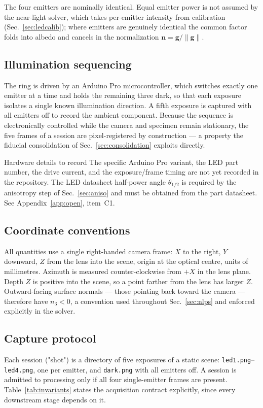\documentclass[journal,10pt]{IEEEtran}
\newcommand{\vecn}{\bm{n}}
\newcommand{\vecg}{\bm{g}}
\begin{document}
The four emitters are nominally identical. Equal emitter power is not assumed by
the near-light solver, which takes per-emitter intensity from calibration
(Sec.~\ref{sec:ledcalib}); where emitters are genuinely identical the common
factor folds into albedo and cancels in the normalization
$\vecn = \vecg/\lVert\vecg\rVert$.

\subsection{Illumination sequencing}
The ring is driven by an Arduino Pro microcontroller, which switches exactly one
emitter at a time and holds the remaining three dark, so that each exposure
isolates a single known illumination direction. A fifth exposure is captured
with all emitters off to record the ambient component. Because the sequence is
electronically controlled while the camera and specimen remain stationary, the
five frames of a session are pixel-registered by construction --- a property the
fiducial consolidation of Sec.~\ref{sec:consolidation} exploits directly.

\begin{todobox}{Hardware details to record}
The specific Arduino Pro variant, the LED part number, the drive current, and
the exposure/frame timing are not yet recorded in the repository. The LED
datasheet half-power angle $\theta_{1/2}$ is required by the anisotropy step of
Sec.~\ref{sec:aniso} and must be obtained from the part datasheet. See
Appendix~\ref{app:open}, item~C1.
\end{todobox}

\subsection{Coordinate conventions}\label{sec:frame}
All quantities use a single right-handed camera frame: $X$ to the right, $Y$
downward, $Z$ from the lens into the scene, origin at the optical centre, units
of millimetres. Azimuth is measured counter-clockwise from $+X$ in the lens
plane. Depth $Z$ is positive into the scene, so a point farther from the lens
has larger $Z$. Outward-facing surface normals --- those pointing back toward
the camera --- therefore have $n_3 < 0$, a convention used throughout
Sec.~\ref{sec:nlps} and enforced explicitly in the solver.

\subsection{Capture protocol}
Each session ("shot") is a directory of five exposures of a static scene:
\texttt{led1.png}--\texttt{led4.png}, one per emitter, and \texttt{dark.png}
with all emitters off. A session is admitted to processing only if all four
single-emitter frames are present. Table~\ref{tab:invariants} states the
acquisition contract explicitly, since every downstream stage depends on it.
\end{document}
